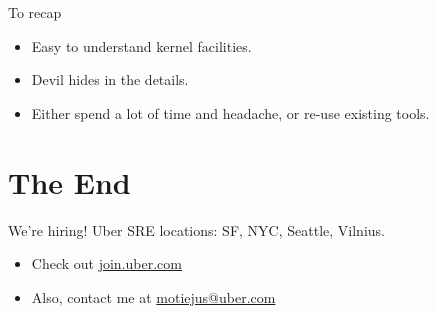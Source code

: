 \documentclass[14pt]{beamer}
\begin{document}
%

\begin{frame}{To recap}
    \begin{itemize}[<+->]
        \item Easy to understand kernel facilities.
        \item Devil hides in the details.
        \item Either spend a lot of time and headache, or re-use existing tools.
    \end{itemize}
\end{frame}

\section{The End}
\begin{frame}{We're hiring!}
    Uber SRE locations: SF, NYC, Seattle, Vilnius.
    \begin{itemize}
        \item Check out \href{http://join.uber.com}{join.uber.com}
        \item Also, contact me at \href{mailto:motiejus@uber.com}{motiejus@uber.com}
    \end{itemize}
\end{frame}
\end{document}
